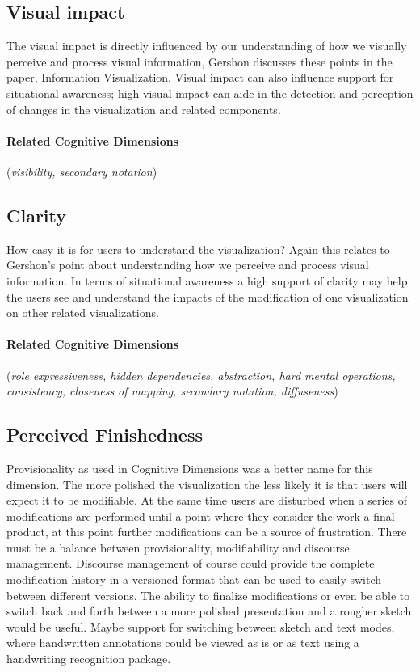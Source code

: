 \documentclass{sig-alternate}
\begin{document}
\subsection{Visual impact}
The visual impact is directly influenced by our understanding of how we visually
perceive  and process visual information, Gershon discusses these points in the
paper, Information Visualization. Visual impact can also influence support for
situational awareness; high visual impact can aide in the detection and
perception of changes in the visualization and related components.
\paragraph{ Related Cognitive Dimensions}
(\emph{visibility, secondary notation})
\subsection{Clarity}
How easy it is for users to understand the visualization? Again this relates to
Gershon's point about understanding how we perceive and process visual
information. In terms of situational awareness a high support of clarity may
help the users see and understand the impacts of the modification of one
visualization on other related visualizations.
\paragraph{Related Cognitive Dimensions}
(\emph{role expressiveness, hidden dependencies, abstraction, hard mental
operations, consistency, closeness of mapping, secondary notation, diffuseness})
\subsection{Perceived Finishedness}
Provisionality as used in Cognitive Dimensions was a better name for this
dimension. The more polished the visualization the less likely it is that users
will expect it to be modifiable. At the same time users are disturbed when a
series of modifications are performed until a point where they consider the work
a final product, at this point further modifications can be a source of
frustration. There must be a balance between provisionality, modifiability and
discourse management. Discourse management of course could provide the complete
modification history in a versioned format that can be used to easily switch
between different versions. The ability to finalize modifications or even be
able to switch back and forth between a more polished presentation and a rougher
sketch would be useful. Maybe support for switching between sketch and text
modes, where handwritten annotations could be viewed as is or as text using a
handwriting recognition package.
\end{document}

